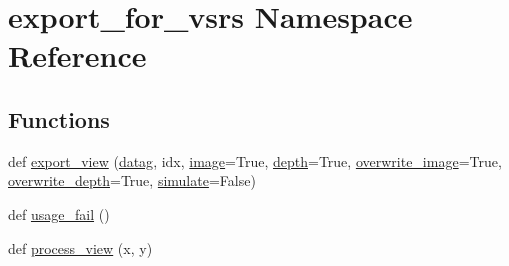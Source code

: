 \hypertarget{namespaceexport__for__vsrs}{}\section{export\+\_\+for\+\_\+vsrs Namespace Reference}
\label{namespaceexport__for__vsrs}
\subsection*{Functions}
\begin{DoxyCompactItemize}
\item 
def \hyperlink{namespaceexport__for__vsrs_ab0fb55b1ba88debd94ecf29fcf6a6bd4}{export\+\_\+view} (\hyperlink{namespaceexport__for__vsrs_a5b30bd98d9fa1b05abdfb7091d19fecd}{datag}, idx, \hyperlink{namespaceexport__for__vsrs_ad5a496494e734ba71579653b24aa1f48}{image}=True, \hyperlink{namespaceexport__for__vsrs_a42168d88de1f21a9d3e767d54e3b93f3}{depth}=True, \hyperlink{namespaceexport__for__vsrs_aa5ec74176e45ab6f4dc1e8fa5e4190b8}{overwrite\+\_\+image}=True, \hyperlink{namespaceexport__for__vsrs_a3bd825d865a68f2a90e102b8c6c15d28}{overwrite\+\_\+depth}=True, \hyperlink{namespaceexport__for__vsrs_a553d224871aaf86fb6d6c63318f75d4f}{simulate}=False)
\item 
def \hyperlink{namespaceexport__for__vsrs_a73adf54dc0543abd1fdeafbec2aec157}{usage\+\_\+fail} ()
\item 
def \hyperlink{namespaceexport__for__vsrs_aa8453fee829cfedbd956de2248e5d7e8}{process\+\_\+view} (x, y)
\end{DoxyCompactItemize}
